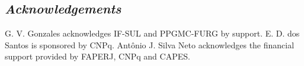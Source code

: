 \documentclass[12pt,fleqn]{article}
\begin{document}
\subsection*{\textit{Acknowledgements}}
G. V. Gonzales acknowledges IF-SUL and PPGMC-FURG by support. E. D. dos Santos is sponsored by CNPq. Antônio J. Silva Neto acknowledges the financial support provided by FAPERJ, CNPq and CAPES.



\fontsize{11}{0}\selectfont







\end{document}
